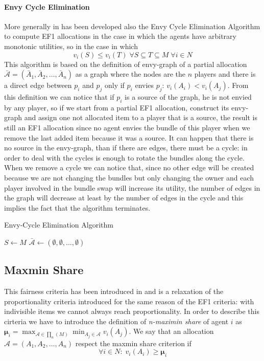 \paragraph{Envy Cycle Elimination}
More generally in \cite{DBLP:LiptonMMS04-EF1} has been developed also the Envy Cycle Elimination Algorithm to compute EF1 allocations in the case in which the agents have arbitrary monotonic utilities, so in the case in which 
$$v_i(S) \le v_i(T)\; \forall S\subseteq T\subseteq M\;\forall i\in N$$
This algorithm is based on the definition of envy-graph of a partial allocation $\mathcal{\bar A} = (\bar A_1, \bar A_2, \dots, \bar A_n )$ as a graph where the nodes are the $n$ players and there is a direct edge between $p_i$ and $p_j$ only if $p_i$ envies $p_j$: $v_i(A_i) < v_i(A_j)$. From this definition we can notice that if $p_i$ is a source of the graph, he is not envied by any player, so if we start from a partial EF1 allocation, construct its envy-graph and assign one not allocated item to a player that is a source, the result is still an EF1 allocation since no agent envies the bundle of this player when we remove the last added item because it was a source. It can happen that there is no source in the envy-graph, than if there are edges, there must be a cycle: in order to deal with the cycles is enough to rotate the bundles along the cycle. When we remove a cycle we can notice that, since no other edge will be created because we are not changing the bundles but only changing the owner and each player involved in the bundle swap will increase its utility, the number of edges in the graph will decrease at least by the number of edges in the cycle and this implies the fact that the algorithm terminates.

\begin{algorithm}
\caption{Envy-Cycle Elimination Algorithm}\label{alg:Envy-CycleElimination}
$S\gets M$\;
$\mathcal{\bar A}\gets (\emptyset, \emptyset, \dots,\emptyset)$\;
\end{algorithm}

\subsection{Maxmin Share}
This fairness criteria has been introduced in \cite{DBLP:Budish10-mms} and is a relaxation of the proportionality criteria introduced for the same reason of the EF1 criteria: with indivisible items we cannot always reach proportionality. In order to describe this cirteria we have to introduce the definition of \textit{n-maximin share} of agent $i$ as $\boldsymbol \mu_i = \max_{\mathcal{A} \in \prod_n(M)} \min_{A_j\in \mathcal{A}} v_i(A_j)$. We say that an allocation $\mathcal{A} = (A_1, A_2, \dots, A_n)$ respect the maxmin share criterion if $$\forall i\in N:\; v_i(A_i) \ge \boldsymbol \mu_i$$


